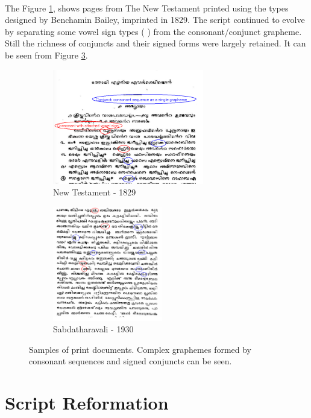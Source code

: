 \documentclass[10pt]{article}
\begin{document}
\paragraph{}
The Figure \ref{newtestament}, shows pages from The New Testament printed using the types designed by Benchamin Bailey, imprinted in 1829\cite{babucherian}. The script continued to evolve by separating some vowel sign types ({ }) from the consonant/conjunct grapheme. Still the richness of conjuncts and their signed forms were largely retained. It can be seen from Figure \ref{Sabdatharavali}. 

\begin{figure}[h!]
\begin{subfigure}{.5\textwidth}
 \centering
 \includegraphics[width=\linewidth, height=5cm]{images/newtestament1829.png}
 \caption{New Testament - 1829}
 \label{newtestament}
\end{subfigure}%
\begin{subfigure}{.5\textwidth}
 \centering
 \includegraphics[width=\linewidth,height=5cm]{images/1930-Sabdatharavali.png}
 \caption{Sabdatharavali - 1930 }
 \label{Sabdatharavali}
\end{subfigure}
\caption{Samples of print documents. Complex graphemes formed by consonant sequences and signed conjuncts can be seen.}
\end{figure}


\section{Script Reformation}
\end{document}
